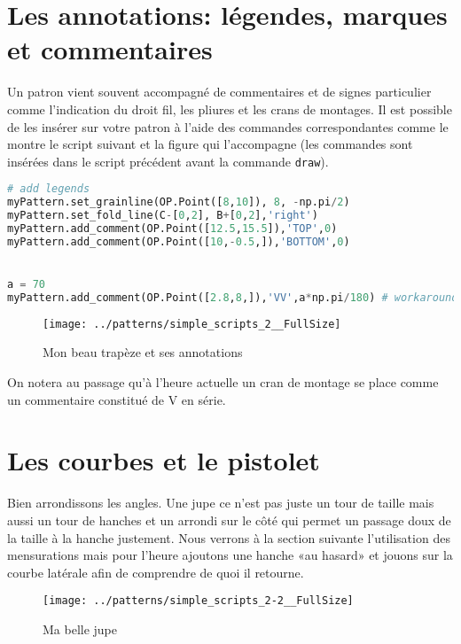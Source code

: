 \documentclass[10pt,a4paper,twoside]{report}
\begin{document}
\section{Les annotations: légendes, marques et commentaires}

Un patron vient souvent accompagné de commentaires et de signes particulier comme l'indication du droit fil, les pliures et les crans de montages. Il est possible de les insérer sur votre patron à l'aide des commandes correspondantes comme le montre le script suivant et la figure qui l'accompagne (les commandes sont insérées dans le script précédent avant la commande \texttt{draw}).

\begin{lstlisting}[language=Python]
# add legends
myPattern.set_grainline(OP.Point([8,10]), 8, -np.pi/2)
myPattern.set_fold_line(C-[0,2], B+[0,2],'right')
myPattern.add_comment(OP.Point([12.5,15.5]),'TOP',0)
myPattern.add_comment(OP.Point([10,-0.5,]),'BOTTOM',0)


a = 70
myPattern.add_comment(OP.Point([2.8,8,]),'VV',a*np.pi/180) # workaround for notches
\end{lstlisting}


\begin{figure}
\begin{center}
\texttt{[image: ../patterns/simple\_scripts\_2\_\_FullSize]}
\end{center}
\caption{Mon beau trapèze et ses annotations}
\label{fig:trapeze}
\end{figure}

On notera au passage qu'à l'heure actuelle un cran de montage se place comme un commentaire constitué de V en série.

\section{Les courbes et le pistolet}
Bien arrondissons les angles. Une jupe ce n'est pas juste un tour de taille mais aussi un tour de hanches et un arrondi sur le côté qui permet un passage doux de la taille à la hanche justement. Nous verrons à la section suivante l'utilisation des mensurations mais pour l'heure ajoutons une hanche «au hasard» et jouons sur la courbe latérale afin de comprendre de quoi il retourne.



\begin{figure}
\begin{center}
\texttt{[image: ../patterns/simple\_scripts\_2-2\_\_FullSize]}
\end{center}
\caption{Ma belle jupe}
\label{fig:trapeze}
\end{figure}
\end{document}
